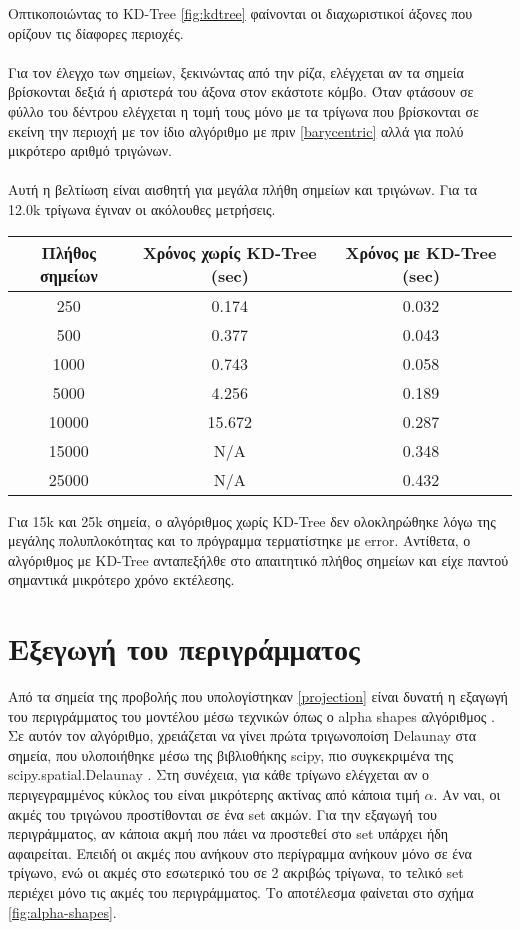 \documentclass{report}
\begin{document}
Οπτικοποιώντας το KD-Tree \ref{fig:kdtree} φαίνονται οι διαχωριστικοί άξονες που ορίζουν τις δίαφορες περιοχές.
\\\\
Για τον έλεγχο των σημείων, ξεκινώντας από την ρίζα, ελέγχεται αν τα σημεία βρίσκονται δεξιά ή αριστερά του άξονα στον εκάστοτε
κόμβο. Όταν φτάσουν σε φύλλο του δέντρου ελέγχεται η τομή τους μόνο με τα τρίγωνα που βρίσκονται σε εκείνη την περιοχή με τον 
ίδιο αλγόριθμο με πριν \eqref{barycentric} αλλά για πολύ μικρότερο αριθμό τριγώνων.
\\\\
Αυτή η βελτίωση είναι αισθητή για μεγάλα πλήθη σημείων και τριγώνων. Για τα 12.0k τρίγωνα έγιναν οι ακόλουθες μετρήσεις.
\begin{table}[H]
    \centering
    \begin{tabular}{c||c c}
        Πλήθος σημείων & Χρόνος χωρίς KD-Tree (sec) & Χρόνος με KD-Tree (sec) \\
        \hline
        250 & 0.174 & 0.032 \\
        500 & 0.377 & 0.043 \\
        1000 & 0.743 & 0.058 \\
        5000 & 4.256 & 0.189 \\
        10000 & 15.672 & 0.287 \\
        15000 & Ν/Α & 0.348 \\
        25000 & Ν/Α & 0.432 \\
    \end{tabular} 
\end{table}

Για 15k και 25k σημεία, ο αλγόριθμος χωρίς KD-Tree δεν ολοκληρώθηκε λόγω της μεγάλης πολυπλοκότητας και το πρόγραμμα τερματίστηκε με error.
Αντίθετα, ο αλγόριθμος με KD-Tree ανταπεξήλθε στο απαιτητικό πλήθος σημείων και είχε παντού σημαντικά μικρότερο χρόνο εκτέλεσης.


\section{Εξεγωγή του περιγράμματος}
Από τα σημεία της προβολής που υπολογίστηκαν \ref{projection} είναι δυνατή η εξαγωγή του περιγράμματος
του μοντέλου μέσω τεχνικών όπως ο alpha shapes αλγόριθμος \cite{alpha-shapes}. Σε αυτόν τον αλγόριθμο, χρειάζεται να γίνει πρώτα
τριγωνοποίση Delaunay \cite{delanuay-triangulation} στα σημεία, που υλοποιήθηκε μέσω της βιβλιοθήκης scipy, πιο συγκεκριμένα
της scipy.spatial.Delaunay \cite{2020SciPy-NMeth}. Στη συνέχεια, για κάθε τρίγωνο ελέγχεται αν ο περιγεγραμμένος κύκλος του
είναι μικρότερης ακτίνας από κάποια τιμή $\alpha$. Αν ναι, οι ακμές του τριγώνου προστίθονται σε ένα set ακμών. Για την εξαγωγή
του περιγράμματος, αν κάποια ακμή που πάει να προστεθεί στο set υπάρχει ήδη αφαιρείται. Επειδή οι ακμές που ανήκουν στο περίγραμμα
ανήκουν μόνο σε ένα τρίγωνο, ενώ οι ακμές στο εσωτερικό του
σε 2 ακριβώς τρίγωνα, το τελικό set περιέχει μόνο τις ακμές του περιγράμματος. Το αποτέλεσμα φαίνεται στο σχήμα \ref{fig:alpha-shapes}.
\end{document}
